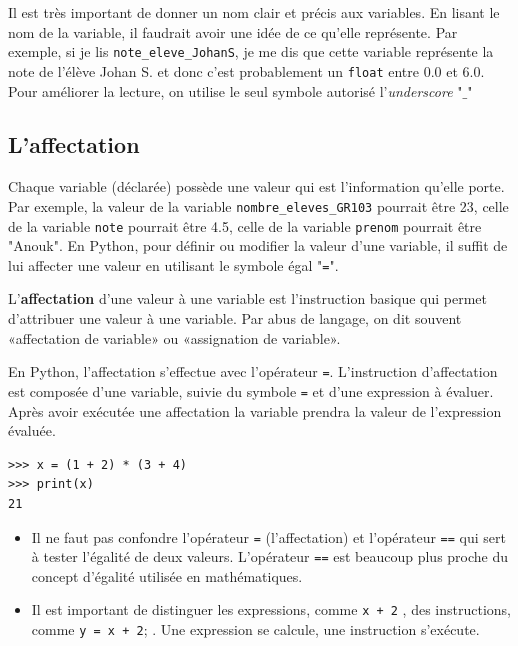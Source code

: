 \documentclass[11pt, a4paper]{book}
\begin{document}
\begin{eclairage}
	Il est très important de donner un nom clair et précis aux variables. En lisant le nom de la variable, il faudrait avoir une idée de ce qu'elle représente.
	Par exemple, si je lis \lstinline{note_eleve_JohanS}, je me dis que cette variable représente la note de l'élève Johan S. et donc c'est probablement un \lstinline{float} entre 0.0 et 6.0. Pour améliorer la lecture, on utilise le seul symbole autorisé l'\textit{underscore} "$\_$"\\
\end{eclairage}


\subsection{L'affectation}
Chaque variable (déclarée) possède une valeur qui est l’information qu’elle porte. Par exemple, la valeur de la variable \lstinline{nombre_eleves_GR103} pourrait être 23, celle de la variable \lstinline{note} pourrait être 4.5, celle de la variable \lstinline{prenom} pourrait être "Anouk".
En Python, pour définir ou modifier la valeur d’une variable, il suffit de lui affecter une valeur en utilisant le symbole égal "\lstinline{=}". 
\begin{mydefinition}
	L’\textbf{affectation} d’une valeur à une variable est l’instruction basique qui permet d’attribuer une valeur à une variable. Par abus de langage, on dit souvent «affectation de variable» ou «assignation de variable».
\end{mydefinition}
En Python, l'affectation s’effectue avec l’opérateur \lstinline{=}. L'instruction d'affectation est composée d'une variable, suivie du symbole  \lstinline{=} et d'une expression à évaluer. Après avoir exécutée une affectation la variable prendra la valeur de l'expression évaluée.
\begin{myexample}
	\begin{lstlisting}[numbers=none]
>>> x = (1 + 2) * (3 + 4)
>>> print(x)
21
	\end{lstlisting}
\end{myexample}

\begin{important}
	\begin{itemize}
		\item 	Il ne faut pas confondre l'opérateur \lstinline{=} (l'affectation) et l'opérateur \lstinline{==} qui sert à tester l'égalité de deux valeurs. L'opérateur \lstinline{==} est beaucoup plus proche du concept d'égalité utilisée en mathématiques.
		\item Il est important de distinguer les expressions, comme \lstinline{x + 2} , des instructions, comme \lstinline{y = x + 2}; . Une expression se calcule, une instruction s’exécute.
	\end{itemize}
	
\end{important}
\end{document}
